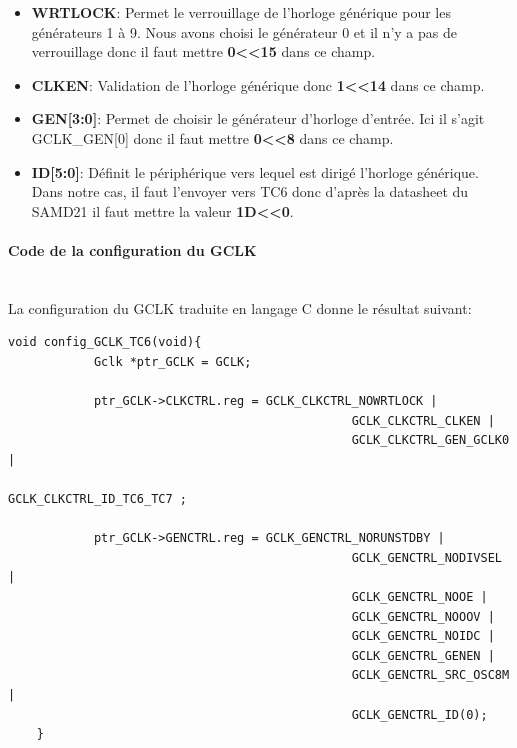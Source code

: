 \documentclass[a4paper]{article}
\begin{document}
	\begin{itemize}
		\item {\bf WRTLOCK}: Permet le verrouillage de l’horloge générique pour les générateurs 1 à 9. Nous avons choisi le générateur 0 et il n’y a pas de verrouillage donc il faut mettre {\bf 0\textless\textless15} dans ce champ.~~\\
		\item {\bf CLKEN}: Validation de l’horloge générique donc {\bf 1\textless\textless14} dans ce champ.~~\\
		\item {\bf GEN[3:0]}: Permet de choisir le générateur d’horloge d’entrée. Ici il s’agit GCLK\_GEN[0] donc il faut mettre {\bf 0\textless\textless8} dans ce champ.~~\\
		\item {\bf ID[5:0]}: Définit le périphérique vers lequel est dirigé l’horloge générique. Dans notre cas, il faut l’envoyer vers TC6 donc d’après la datasheet du SAMD21 il faut mettre la valeur {\bf 1D\textless\textless0}.~~\\
	\end{itemize}
	
	\paragraph{Code de la configuration du GCLK} ~~\\
	La configuration du GCLK traduite en langage C donne le résultat suivant:
	\begin{lstlisting}[style=CStyle]
    void config_GCLK_TC6(void){
	        Gclk *ptr_GCLK = GCLK;
	
	        ptr_GCLK->CLKCTRL.reg = GCLK_CLKCTRL_NOWRTLOCK |
							                    GCLK_CLKCTRL_CLKEN |
							                    GCLK_CLKCTRL_GEN_GCLK0 |
							                    GCLK_CLKCTRL_ID_TC6_TC7 ;
	
	        ptr_GCLK->GENCTRL.reg = GCLK_GENCTRL_NORUNSTDBY |
							                    GCLK_GENCTRL_NODIVSEL |
							                    GCLK_GENCTRL_NOOE |
							                    GCLK_GENCTRL_NOOOV |
							                    GCLK_GENCTRL_NOIDC |
							                    GCLK_GENCTRL_GENEN |
							                    GCLK_GENCTRL_SRC_OSC8M |
						        	            GCLK_GENCTRL_ID(0);
    }
	\end{lstlisting}
	
\end{document}
